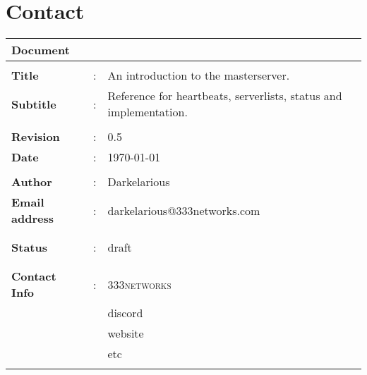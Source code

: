 \chapter*{Contact}

\begin{tabular}{p{} p{} p{}}
{\bf Document}          &   &\\\hline
\\
{\bf Title}             & : & An introduction to the masterserver.\\
{\bf Subtitle}          & : & Reference for heartbeats, serverlists, status and implementation.\\
\\
{\bf Revision}          & : & 0.5\\
{\bf Date}              & : & \today\\
\\
{\bf Author}            & : & Darkelarious\\
{\bf Email address}     & : & darkelarious@333networks.com\\
\\
\\
{\bf Status}            & : & draft\\
\\
\\
{\bf Contact Info}      & : & \textsc{333networks}\\
                        &   & discord\\
                        &   & website\\
                        &   & etc\\
\\
\hline
\end{tabular}

